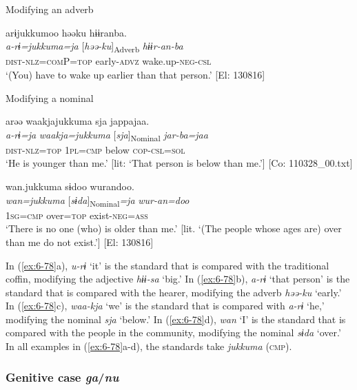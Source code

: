   Modifying an adverb

\ex
{\TM}
\glll arɨjukkumoo  həəku  hɨɨranba.\\
\textit{a-rɨ=jukkuma=ja}  [\textit{həə-ku}]\textsubscript{Adverb}  \textit{hɨɨr-an-ba}\\
\textsc{dist}-\textsc{nlz}=\textsc{com}P=\textsc{top}  early-\textsc{advz}  wake.up-\textsc{neg}-\textsc{csl}\\
\glt ‘(You) have to wake up earlier than that person.’ [El: 130816]

  Modifying a nominal

\ex
{\TM}
\glll arəə  waakjajukkuma  sja  jappajaa.\\
\textit{a-rɨ=ja}  \textit{waakja=jukkuma}  [\textit{sja}]\textsubscript{Nominal}  \textit{jar-ba=jaa}\\
\textsc{dist}-\textsc{nlz}=\textsc{top}  1\textsc{pl}=\textsc{cmp}  below  \textsc{cop}-\textsc{csl}=\textsc{sol}\\
\glt ‘He is younger than me.’ [lit: ‘That person is below than me.’]      [Co: 110328\_00.txt]

\ex
{\TM}
\glll wan.jukkuma  sɨdoo  wurandoo.\\
\textit{wan=jukkuma}  [\textit{sɨda}]\textsubscript{Nominal}\textit{=ja}  \textit{wur-an=doo}\\
1\textsc{sg}=\textsc{cmp}  over=\textsc{top}  exist-\textsc{neg}=\textsc{ass}\\
\glt ‘There is no one (who) is older than me.’
[lit. ‘(The people whose ages are) over than me do not exist.’]      [El: 130816]
\z
\z

In (\ref{ex:6-78}a), \textit{u-rɨ} ‘it’ is the standard that is compared with the traditional coffin, modifying the adjective \textit{hɨɨ-sa} ‘big.’ In (\ref{ex:6-78}b), \textit{a-rɨ} ‘that person’ is the standard that is compared with the hearer, modifying the adverb \textit{həə-ku} ‘early.’ In (\ref{ex:6-78}c), \textit{waa-kja} ‘we’ is the standard that is compared with \textit{a-rɨ} ‘he,’ modifying the nominal \textit{sja} ‘below.’ In (\ref{ex:6-78}d), \textit{wan} ‘I’ is the standard that is compared with the people in the community, modifying the nominal \textit{sɨda} ‘over.’ In all examples in (\ref{ex:6-78}a-d), the standards take \textit{jukkuma} (\textsc{cmp}).

\subsubsection{ Genitive case \textit{ga}/\textit{nu}}

